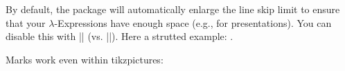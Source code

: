 \documentclass[parskip=half,english,numbers=noenddot,footnotes=nomultiple,oneside]{scrartcl}
\begin{document}
   By default, the package will automatically enlarge the line skip limit to ensure that your \(\lambda\)-Expressions have enough space (e.g., for presentations). You can disable this with |\lcDoNotStrutLine| (vs. |\lcDoStrutLine|). Here a strutted example: {\lcDoStrutLine{}}.


   Marks work even within tikzpictures:


   \begin{center}
   \end{center}
\end{document}
